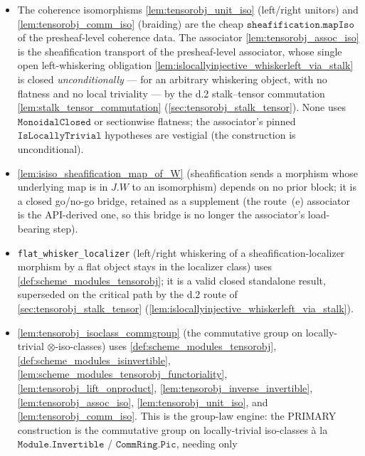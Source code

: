 \begin{itemize}
    to give the full \(\MonoidalCategory\) structure on
    \(\Scheme.\mathtt{Modules}\,X\); it is stated-but-unformalized, pending the
    sole open proof obligation.
  \item The coherence isomorphisms \cref{lem:tensorobj_unit_iso}
    (left/right unitors) and \cref{lem:tensorobj_comm_iso} (braiding) are the cheap
    \(\mathtt{sheafification.mapIso}\) of the presheaf-level coherence data. The
    associator \cref{lem:tensorobj_assoc_iso} is the sheafification transport of the
    presheaf-level associator, whose single open left-whiskering obligation
    \cref{lem:islocallyinjective_whiskerleft_via_stalk} is closed
    \emph{unconditionally} --- for an arbitrary whiskering object, with no flatness and
    no local triviality --- by the d.2 stalk--tensor commutation
    \cref{lem:stalk_tensor_commutation} (\cref{sec:tensorobj_stalk_tensor}).
    None uses \(\mathtt{MonoidalClosed}\) or sectionwise flatness; the associator's
    pinned \(\mathtt{IsLocallyTrivial}\) hypotheses are vestigial (the construction is
    unconditional).
  \item \cref{lem:isiso_sheafification_map_of_W} (sheafification sends a
    morphism whose underlying map is in \(J.W\) to an isomorphism) depends on no
    prior block; it is a closed go/no-go bridge, retained as a supplement (the
    route~(e) associator is the API-derived one, so this bridge is no longer the
    associator's load-bearing step).
  \item \texttt{flat\_whisker\_localizer} (left/right whiskering of a
    sheafification-localizer morphism by a flat object stays in the localizer
    class) uses \cref{def:scheme_modules_tensorobj}; it is a valid closed
    standalone result, superseded on the critical path by the d.2 route of
    \cref{sec:tensorobj_stalk_tensor}
    (\cref{lem:islocallyinjective_whiskerleft_via_stalk}).
  \item \cref{lem:tensorobj_isoclass_commgroup} (the commutative group on
    locally-trivial \(\otimes\)-iso-classes) uses
    \cref{def:scheme_modules_tensorobj},
    \cref{def:scheme_modules_isinvertible},
    \cref{lem:scheme_modules_tensorobj_functoriality},
    \cref{lem:tensorobj_lift_onproduct},
    \cref{lem:tensorobj_inverse_invertible},
    \cref{lem:tensorobj_assoc_iso},
    \cref{lem:tensorobj_unit_iso}, and
    \cref{lem:tensorobj_comm_iso}. This is the group-law engine: the PRIMARY
    construction is the commutative group on locally-trivial iso-classes à la
    \(\mathtt{Module.Invertible}\) / \(\mathtt{CommRing.Pic}\), needing only

\end{itemize}
